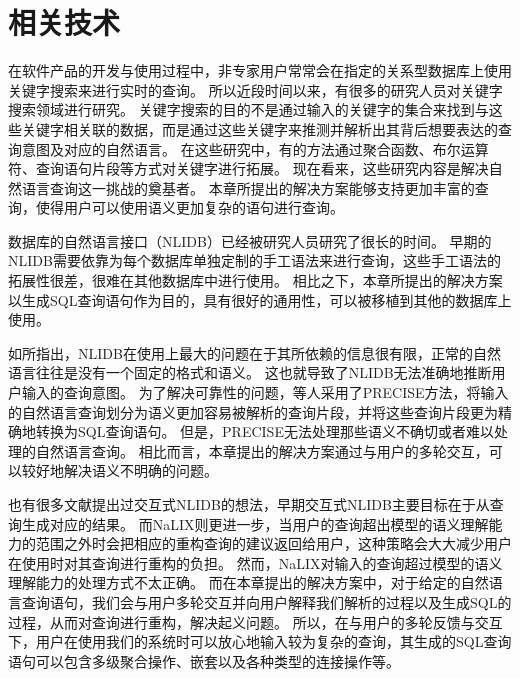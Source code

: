 \section{相关技术}
在软件产品的开发与使用过程中，非专家用户常常会在指定的关系型数据库上使用关键字搜索\cite{bhalotia2002keyword,yu2010keyword,agrawal2002dbxplorer,hristidis2002discover}来进行实时的查询。
所以近段时间以来，有很多的研究人员对关键字搜索领域进行研究\cite{tata2008sqak,simitsis2008precis,ganti2010keyword++,blunschi2012soda,bergamaschi2013quest}。
关键字搜索的目的不是通过输入的关键字的集合来找到与这些关键字相关联的数据，而是通过这些关键字来推测并解析出其背后想要表达的查询意图及对应的自然语言。
在这些研究中，有的方法通过聚合函数\cite{tata2008sqak}、布尔运算符\cite{simitsis2008precis}、查询语句片段\cite{blunschi2012soda}等方式对关键字进行拓展。
现在看来，这些研究内容是解决自然语言查询这一挑战的奠基者。
本章所提出的解决方案能够支持更加丰富的查询，使得用户可以使用语义更加复杂的语句进行查询。

数据库的自然语言接口（NLIDB）已经被研究人员研究了很长的时间\cite{Androutsopoulos1995Natural}。
早期的NLIDB需要依靠为每个数据库单独定制的手工语法来进行查询，这些手工语法的拓展性很差，很难在其他数据库中进行使用。
相比之下，本章所提出的解决方案以生成SQL查询语句作为目的，具有很好的通用性，可以被移植到其他的数据库上使用。
 
如\cite{popescu2003towards}所指出，NLIDB在使用上最大的问题在于其所依赖的信息很有限，正常的自然语言往往是没有一个固定的格式和语义。
这也就导致了NLIDB无法准确地推断用户输入的查询意图。
为了解决可靠性的问题，\cite{popescu2003towards,popescu2004modern}等人采用了PRECISE方法，将输入的自然语言查询划分为语义更加容易被解析的查询片段，并将这些查询片段更为精确地转换为SQL查询语句。
但是，PRECISE无法处理那些语义不确切或者难以处理的自然语言查询。
相比而言，本章提出的解决方案通过与用户的多轮交互，可以较好地解决语义不明确的问题。

也有很多文献\cite{Androutsopoulos1995Natural,kuepper1993nauda,li2005nalix}提出过交互式NLIDB的想法，早期交互式NLIDB\cite{Androutsopoulos1995Natural,kuepper1993nauda}主要目标在于从查询生成对应的结果。
而NaLIX\cite{li2005nalix}则更进一步，当用户的查询超出模型的语义理解能力的范围之外时会把相应的重构查询的建议返回给用户，这种策略会大大减少用户在使用时对其查询进行重构的负担。
然而，NaLIX对输入的查询超过模型的语义理解能力的处理方式不太正确。
而在本章提出的解决方案中，对于给定的自然语言查询语句，我们会与用户多轮交互并向用户解释我们解析的过程以及生成SQL的过程，从而对查询进行重构，解决起义问题。
所以，在与用户的多轮反馈与交互下，用户在使用我们的系统时可以放心地输入较为复杂的查询，其生成的SQL查询语句可以包含多级聚合操作、嵌套以及各种类型的连接操作等。

